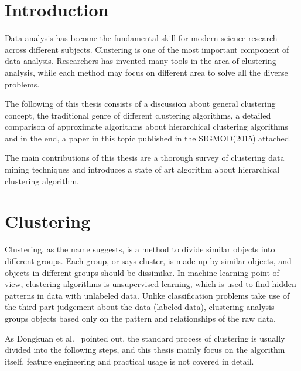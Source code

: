 \documentclass[utf8,english]{gradu3}
\begin{document}
\newtheorem{definition}{Definition}

\mainmatter

\chapter{Introduction}


Data analysis has become the fundamental skill for modern science research across different subjects. Clustering is one of the most important component of data analysis. Researchers has invented many tools in the area of clustering analysis, while each method may focus on different area to solve all the diverse problems. 

The following of this thesis consists of a discussion about general clustering concept, the traditional genre of different clustering algorithms, a detailed comparison of approximate algorithms about hierarchical clustering algorithms and in the end, a paper in this topic  published in the SIGMOD(2015) attached.

The main contributions of this thesis are a thorough survey of clustering data mining techniques and introduces a state of art algorithm about hierarchical clustering algorithm.


\chapter{Clustering}


Clustering, as the name suggests, is a method to divide similar objects into different groups. Each group, or says cluster, is made up by similar objects, and objects in different groups should be dissimilar. In machine learning point of view, clustering algorithms is unsupervised learning, which is used to find hidden patterns in data with unlabeled data. Unlike classification problems take use of the third part judgement about the data (labeled data), clustering analysis groups objects based only on the pattern and relationships of the raw data. 

As Dongkuan et al.~ \cite{xu2015comprehensive} pointed out, the standard process of clustering is usually divided into the following steps, and this thesis mainly focus on the algorithm itself, feature engineering and practical usage is not covered in detail.
\end{document}
